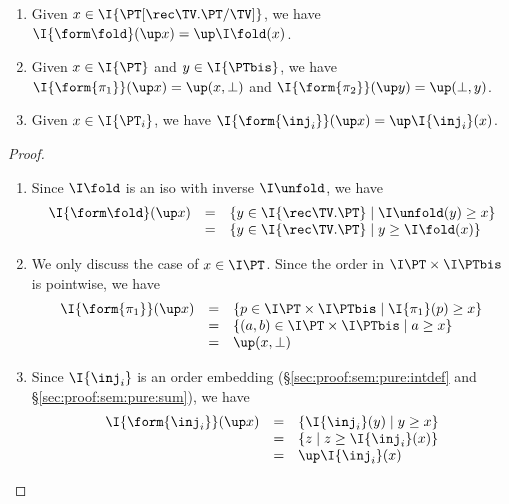 \begin{lemma}
\label{lem:proof:sem:log:mod:upset}
\hfill
\begin{enumerate}[(1)]
\item
Given $x \in \I{\PT[\rec \TV.\PT / \TV]}$,
we have
$\I{\form\fold}(\up x) = \up \I\fold(x)$.

\item
Given $x \in \I{\PT}$ and $y \in \I{\PTbis}$,
we have
$\I{\form{\pi_1}}(\up x) = \up (x, \bot)$
and
$\I{\form{\pi_2}}(\up y) = \up (\bot, y)$.

\item
Given $x \in \I{\PT_i}$,
we have
$\I{\form{\inj_i}}(\up x) = \up \I{\inj_i}(x)$.
\end{enumerate}
\end{lemma}

\begin{proof}
\hfill
\begin{enumerate}[(1)]
\item
Since $\I\fold$ is an iso with inverse $\I\unfold$, we have
\[
\begin{array}{l l l}
  \I{\form\fold}(\up x)
& =
& \left\{
  y \in \I{\rec \TV.\PT}
  \mid
  \I\unfold(y) \geq x
  \right\}
\\
%
& =
& \left\{
  y \in \I{\rec \TV.\PT}
  \mid
  y \geq \I\fold(x)
  \right\}
\end{array}
\]

\item
We only discuss the case of $x \in \I\PT$.
Since the order in $\I\PT \times \I\PTbis$ is pointwise,
we have
\[
\begin{array}{l l l}
  \I{\form{\pi_1}}(\up x)
& =
& \left\{
  p \in \I\PT \times \I\PTbis
  \mid
  \I{\pi_1}(p) \geq x
  \right\}
\\
%
& =
& \left\{
  (a,b) \in \I\PT \times \I\PTbis
  \mid
  a \geq x
  \right\}
\\
%
& =
& \up(x, \bot)
\end{array}
\]

\item
Since $\I{\inj_i}$ is an order embedding
(\S\ref{sec:proof:sem:pure:intdef} and \S\ref{sec:proof:sem:pure:sum}),
we have
\[
\begin{array}{l l l}
  \I{\form{\inj_i}}(\up x)
& =
& \left\{
  \I{\inj_i}(y)
  \mid
  y \geq x
  \right\}
\\
%
& =
& \left\{
  z
  \mid
  z \geq \I{\inj_i}(x)
  \right\}
\\
%
& =
& \up \I{\inj_i}(x)
\end{array}
\]
\qedhere
\end{enumerate}
\end{proof}

